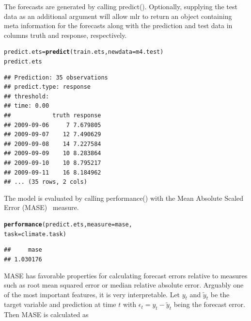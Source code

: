 \documentclass[12pt]{article}\usepackage[]{graphicx}\usepackage[]{color}
\makeatletter
\newcommand{\hlstd}[1]{\textcolor[rgb]{0.345,0.345,0.345}{#1}}%
\newcommand{\hlkwb}[1]{\textcolor[rgb]{0.69,0.353,0.396}{#1}}%
\newcommand{\hlkwc}[1]{\textcolor[rgb]{0.333,0.667,0.333}{#1}}%
\newcommand{\hlkwd}[1]{\textcolor[rgb]{0.737,0.353,0.396}{\textbf{#1}}}%
\newenvironment{kframe}{%
 \def\at@end@of@kframe{}%
 \ifinner\ifhmode%
  \def\at@end@of@kframe{\end{minipage}}%
  \begin{minipage}{\columnwidth}%
 \fi\fi%
 \def\FrameCommand##1{\hskip\@totalleftmargin \hskip-\fboxsep
 \colorbox{shadecolor}{##1}\hskip-\fboxsep
     \hskip-\linewidth \hskip-\@totalleftmargin \hskip\columnwidth}%
 \MakeFramed {\advance\hsize-\width
   \@totalleftmargin\z@ \linewidth\hsize
   \@setminipage}}%
 {\par\unskip\endMakeFramed%
 \at@end@of@kframe}
\newenvironment{knitrout}{}{} %
\theoremstyle{definition}
\newcommand\code{\@codex}
\def\@codex#1{{\normalfont\ttfamily\hyphenchar\font=-1 #1}}
\newcommand{\pkg}[1]{{\fontseries{b}\selectfont #1}}
\makeatother
\begin{document}
The forecasts are generated by calling \code{predict()}. Optionally, supplying the test data as an additional argument will allow \pkg{mlr} to return an object containing meta information for the forecasts along with the prediction and test data in columns \code{truth} and \code{response}, respectively.

\singlespacing
\begin{knitrout}
\color{fgcolor}\begin{kframe}
\begin{alltt}
\hlstd{predict.ets} \hlkwb{=} \hlkwd{predict}\hlstd{(train.ets,} \hlkwc{newdata} \hlstd{= m4.test)}
\hlstd{predict.ets}
\end{alltt}
\begin{verbatim}
## Prediction: 35 observations
## predict.type: response
## threshold: 
## time: 0.00
##            truth response
## 2009-09-06     7 7.679805
## 2009-09-07    12 7.490629
## 2009-09-08    14 7.227584
## 2009-09-09    10 8.283864
## 2009-09-10    10 8.795217
## 2009-09-11    16 8.184962
## ... (35 rows, 2 cols)
\end{verbatim}
\end{kframe}
\end{knitrout}
\doublespacing

The model is evaluated by calling \code{performance()} with the Mean Absolute Scaled Error (MASE)~\cite{Hyndman2006} measure.

\singlespacing
\begin{knitrout}
\color{fgcolor}\begin{kframe}
\begin{alltt}
\hlkwd{performance}\hlstd{(predict.ets,} \hlkwc{measure} \hlstd{= mase,}
            \hlkwc{task} \hlstd{= climate.task)}
\end{alltt}
\begin{verbatim}
##     mase 
## 1.030176
\end{verbatim}
\end{kframe}
\end{knitrout}
\doublespacing
MASE has favorable properties for calculating forecast errors relative to measures such as root mean squared error or median relative absolute error. Arguably one of the most important features, it is very interpretable. Let $y_t$ and $\tilde{y}_t$ be the target variable and prediction at time $t$ with $\epsilon_t = y_t - \tilde{y}_t$ being the forecast error. Then MASE is calculated as
\end{document}
